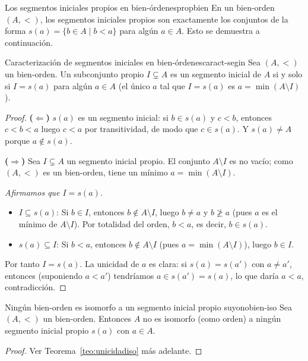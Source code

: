 \begin{observacion}{Los segmentos iniciales propios en bien-órdenes}{propbien}
En un bien-orden $(A, <)$, los segmentos iniciales propios son exactamente los conjuntos de la forma $s(a) = \{b \in A \mid b < a\}$ para algún $a \in A$. Esto se demuestra a continuación.
\end{observacion}

\begin{teorema}{Caracterización de segmentos iniciales en bien-órdenes}{caract-segin}
Sea $(A, <)$ un bien-orden. Un subconjunto propio $I \subsetneq A$ es un segmento inicial de $A$ si y solo si $I = s(a)$ para algún $a \in A$ (el único $a$ tal que $I = s(a)$ es $a = \min(A \setminus I)$).
\end{teorema}

\begin{proof}
\textbf{($\Leftarrow$)} $s(a)$ es un segmento inicial: si $b \in s(a)$ y $c < b$, entonces $c < b < a$ luego $c < a$ por transitividad, de modo que $c \in s(a)$. Y $s(a) \neq A$ porque $a \notin s(a)$.

\textbf{($\Rightarrow$)} Sea $I \subsetneq A$ un segmento inicial propio. El conjunto $A \setminus I$ es no vacío; como $(A,<)$ es un bien-orden, tiene un mínimo $a = \min(A \setminus I)$.

\emph{Afirmamos que $I = s(a)$.}
\begin{itemize}[leftmargin=2em]
  \item $I \subseteq s(a)$: Si $b \in I$, entonces $b \notin A \setminus I$, luego $b \neq a$ y $b \not\geq a$ (pues $a$ es el mínimo de $A \setminus I$). Por totalidad del orden, $b < a$, es decir, $b \in s(a)$.
  \item $s(a) \subseteq I$: Si $b < a$, entonces $b \notin A \setminus I$ (pues $a = \min(A \setminus I)$), luego $b \in I$.
\end{itemize}
Por tanto $I = s(a)$. La unicidad de $a$ es clara: si $s(a) = s(a')$ con $a \neq a'$, entonces (suponiendo $a < a'$) tendríamos $a \in s(a') = s(a)$, lo que daría $a < a$, contradicción.
\end{proof}

\begin{corolario}{Ningún bien-orden es isomorfo a un segmento inicial propio suyo}{nobien-iso}
Sea $(A, <)$ un bien-orden. Entonces $A$ no es isomorfo (como orden) a ningún segmento inicial propio $s(a)$ con $a \in A$.
\end{corolario}

\begin{proof}
Ver Teorema~\ref{teo:unicidadiso} más adelante.
\end{proof}

